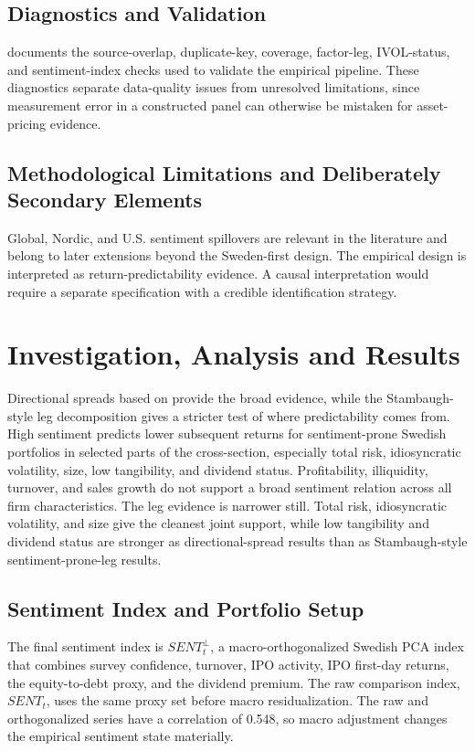 \documentclass[11pt]{article}
\newcommand{\var}[1]{\ensuremath{#1}}
\begin{document}
\subsection{Diagnostics and Validation}
 documents the source-overlap, duplicate-key, coverage, factor-leg, IVOL-status, and sentiment-index checks used to validate the empirical pipeline. These diagnostics separate data-quality issues from unresolved limitations, since measurement error in a constructed panel can otherwise be mistaken for asset-pricing evidence.

\subsection{Methodological Limitations and Deliberately Secondary Elements}
Global, Nordic, and U.S. sentiment spillovers are relevant in the literature and belong to later extensions beyond the Sweden-first design. The empirical design is interpreted as return-predictability evidence. A causal interpretation would require a separate specification with a credible identification strategy.

\section{Investigation, Analysis and Results}
Directional spreads based on \citet{baker2006sentiment} provide the broad evidence, while the Stambaugh-style leg decomposition gives a stricter test of where predictability comes from. High sentiment predicts lower subsequent returns for sentiment-prone Swedish portfolios in selected parts of the cross-section, especially total risk, idiosyncratic volatility, size, low tangibility, and dividend status. Profitability, illiquidity, turnover, and sales growth do not support a broad sentiment relation across all firm characteristics. The leg evidence is narrower still. Total risk, idiosyncratic volatility, and size give the cleanest joint support, while low tangibility and dividend status are stronger as directional-spread results than as Stambaugh-style sentiment-prone-leg results.

\subsection{Sentiment Index and Portfolio Setup}
The final sentiment index is \var{SENT^{\perp}_{t}}, a macro-orthogonalized Swedish PCA index that combines survey confidence, turnover, IPO activity, IPO first-day returns, the equity-to-debt proxy, and the dividend premium. The raw comparison index, \var{SENT_{t}}, uses the same proxy set before macro residualization. The raw and orthogonalized series have a correlation of 0.548, so macro adjustment changes the empirical sentiment state materially.
\end{document}
